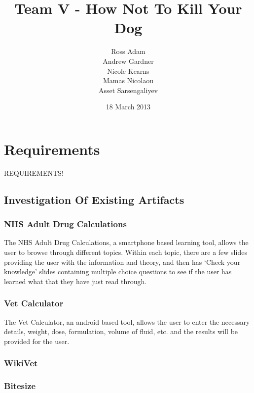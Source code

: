 \documentclass{l3proj}
\begin{document}
\title{Team V - How Not To Kill Your Dog}
\author{Ross Adam \\
        Andrew Gardner \\
        Nicole Kearns \\
        Mamas Nicolaou \\
        Asset Sarsengaliyev}
\date{18 March 2013}
\maketitle

\chapter{Requirements}
\label{req}

REQUIREMENTS!

\section{Investigation Of Existing Artifacts}

\subsection{NHS Adult Drug Calculations}

The NHS Adult Drug Calculations, a smartphone based learning tool, allows the user to browse through different topics. Within each topic, there are a few slides providing the user with the information and theory, and then has ‘Check your knowledge’ slides containing multiple choice questions to see if the user has learned what that they have just read through. 

\subsection{Vet Calculator}

The Vet Calculator, an android based tool, allows the user to enter the necessary details, weight, dose, formulation, volume of fluid, etc. and the results will be provided for the user. 

\subsection{WikiVet}

\subsection{Bitesize}
\end{document}
